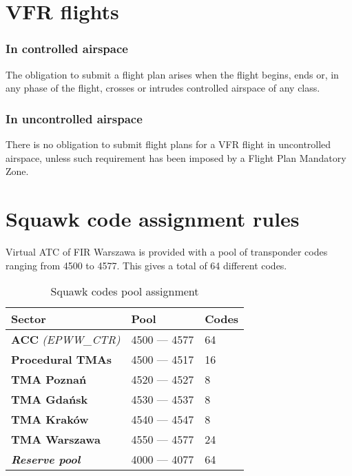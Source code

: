 \section{VFR flights}%

\subsubsection{In controlled airspace}
The obligation to submit a flight plan arises when the flight begins, ends or, in any phase of the flight, crosses or intrudes controlled airspace of any class.

\subsubsection{In uncontrolled airspace}
There is no obligation to submit flight plans for a VFR flight in uncontrolled airspace, unless such requirement has been imposed by a Flight Plan Mandatory Zone.

\section{Squawk code assignment rules}%
\label{sect:airspace:squawks}

Virtual ATC of FIR Warszawa is provided with a pool of transponder codes ranging from 4500 to 4577. This gives a total of 64 different codes.

\begin{table}[htbp]
    \centering
    \begin{tabular}{|l|l|l|}
        \rowcolor{vred}
        \color{white}\textbf Sector & \color{white}\textbf Pool & \color{white}\textbf Codes\\\hline
        \textbf{ACC} \textit{(EPWW\_CTR)} & 4500 --- 4577 & 64\\\hline
        \textbf{Procedural TMAs} & 4500 --- 4517 & 16 \\\hline
        \textbf{TMA Poznań} & 4520 --- 4527 & 8\\\hline
        \textbf{TMA Gdańsk} & 4530 --- 4537 & 8\\\hline
        \textbf{TMA Kraków} & 4540 --- 4547 & 8\\\hline
        \textbf{TMA Warszawa} & 4550 --- 4577 & 24\\\hline
        \textit{\textbf{Reserve pool}} & 4000 --- 4077 & 64\\\hline
    \end{tabular}
    \caption{Squawk codes pool assignment}
    \label{tbl:squawk}
\end{table}

